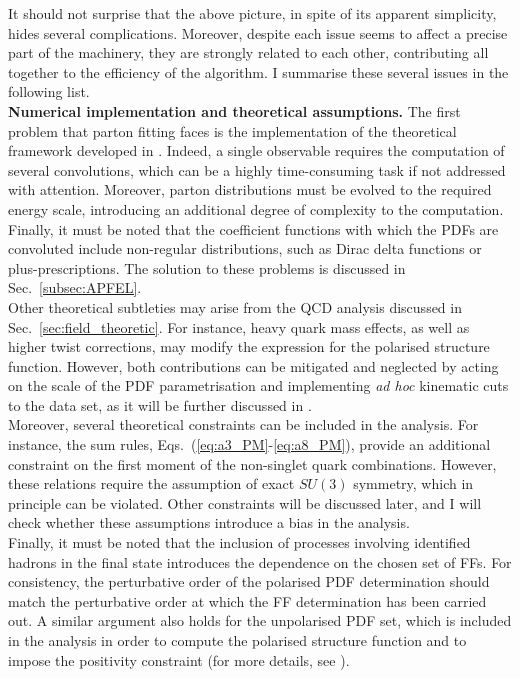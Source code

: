 It should not surprise that the above picture, in spite of its apparent simplicity, hides several complications. Moreover, despite each issue seems to  affect a precise part of the machinery, they are strongly related to each other, contributing all together to the efficiency of the algorithm. I summarise these several issues in the following list.\\[10pt]
\begingroup
\textbf{Numerical implementation and theoretical assumptions.} The first problem that parton fitting faces is the implementation of the theoretical framework developed in . Indeed, a single observable requires the computation of several convolutions, which can be a highly time-consuming task if not addressed with attention. Moreover, parton distributions must be evolved to the required energy scale, introducing an additional degree of complexity to the computation. Finally, it must be noted that the coefficient functions with which the PDFs are convoluted include non-regular distributions, such as Dirac delta functions or plus-prescriptions. The solution to these problems is discussed in Sec.~\ref{subsec:APFEL}.
\\[6pt]
Other theoretical subtleties may arise from the QCD analysis discussed in Sec.~\ref{sec:field_theoretic}. For instance, heavy quark mass effects, as well as higher twist corrections, may modify the expression for the polarised structure function. However, both contributions can be mitigated and neglected by acting on the scale of the PDF parametrisation and implementing \textit{ad hoc} kinematic cuts to the data set, as it will be further discussed in .
\\[6pt]
Moreover, several theoretical constraints can be included in the analysis. For instance, the sum rules, Eqs.~(\ref{eq:a3_PM}-\ref{eq:a8_PM}), provide an additional constraint on the first moment of the non-singlet quark combinations. However, these relations require the assumption of exact $SU(3)$ symmetry, which in principle can be violated. Other constraints will be discussed later, and I will check whether these assumptions introduce a bias in the analysis.
\\[6pt]
Finally, it must be noted that the inclusion of processes involving identified hadrons in the final state introduces the dependence on the chosen set of FFs. For consistency, the perturbative order of the polarised PDF determination should match the perturbative order at which the FF determination has been carried out. A similar argument also holds for the unpolarised PDF set, which is included in the analysis in order to compute the polarised structure function and to impose the positivity constraint (for more details, see ).
